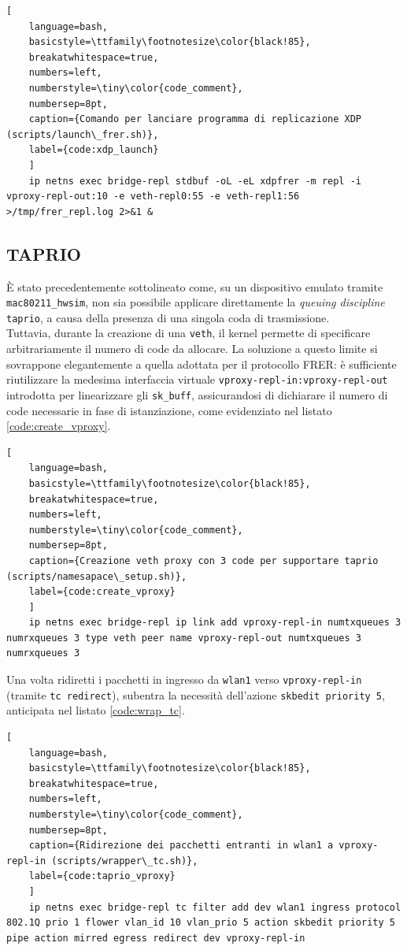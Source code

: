 \documentclass[12pt,a4paper,twoside]{book}
\newcommand{\hwsim}{\mbox{\texttt{mac80211\_hwsim}}\xspace}
\begin{document}
\begin{onehalfspace}
\begin{lstlisting}[
    language=bash,
    basicstyle=\ttfamily\footnotesize\color{black!85},
    breakatwhitespace=true,
    numbers=left,
    numberstyle=\tiny\color{code_comment},
    numbersep=8pt,
    caption={Comando per lanciare programma di replicazione XDP (scripts/launch\_frer.sh)},
    label={code:xdp_launch}
    ]
    ip netns exec bridge-repl stdbuf -oL -eL xdpfrer -m repl -i vproxy-repl-out:10 -e veth-repl0:55 -e veth-repl1:56 >/tmp/frer_repl.log 2>&1 &
\end{lstlisting}

\subsection{TAPRIO}
\label{subsec:taprio}
È stato precedentemente sottolineato come, su un dispositivo emulato tramite \hwsim, non sia possibile applicare direttamente la \textit{queuing discipline} \texttt{taprio}, a causa della presenza di una singola coda di trasmissione. 
\\
Tuttavia, durante la creazione di una \texttt{veth}, il kernel permette di specificare arbitrariamente il numero di code da allocare. La soluzione a questo limite si sovrappone elegantemente a quella adottata per il protocollo FRER: è sufficiente riutilizzare la medesima interfaccia virtuale \texttt{vproxy-repl-in:vproxy-repl-out} introdotta per linearizzare gli \texttt{sk\_buff}, assicurandosi di dichiarare il numero di code necessarie in fase di istanziazione, come evidenziato nel listato \ref{code:create_vproxy}.

\begin{lstlisting}[
    language=bash,
    basicstyle=\ttfamily\footnotesize\color{black!85},
    breakatwhitespace=true,
    numbers=left,
    numberstyle=\tiny\color{code_comment},
    numbersep=8pt,
    caption={Creazione veth proxy con 3 code per supportare taprio (scripts/namesapace\_setup.sh)},
    label={code:create_vproxy}
    ]
    ip netns exec bridge-repl ip link add vproxy-repl-in numtxqueues 3 numrxqueues 3 type veth peer name vproxy-repl-out numtxqueues 3 numrxqueues 3
\end{lstlisting}

Una volta ridiretti i pacchetti in ingresso da \texttt{wlan1} verso \texttt{vproxy-repl-in} (tramite \texttt{tc redirect}), subentra la necessità dell'azione \texttt{skbedit priority 5}, anticipata nel listato \ref{code:wrap_tc}.

\begin{lstlisting}[
    language=bash,
    basicstyle=\ttfamily\footnotesize\color{black!85},
    breakatwhitespace=true,
    numbers=left,
    numberstyle=\tiny\color{code_comment},
    numbersep=8pt,
    caption={Ridirezione dei pacchetti entranti in wlan1 a vproxy-repl-in (scripts/wrapper\_tc.sh)},
    label={code:taprio_vproxy}
    ]
    ip netns exec bridge-repl tc filter add dev wlan1 ingress protocol 802.1Q prio 1 flower vlan_id 10 vlan_prio 5 action skbedit priority 5 pipe action mirred egress redirect dev vproxy-repl-in
\end{lstlisting}


\end{onehalfspace}
\end{document}
